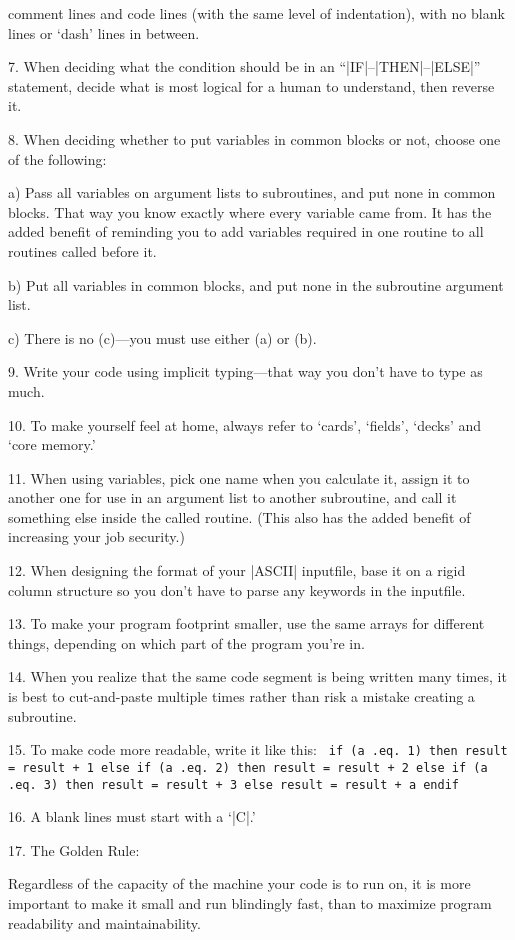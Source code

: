    comment lines and code lines (with the same level of indentation), with 
   no blank lines or `dash' lines in between.
\item{7.} When deciding what the condition should be in an
``|IF|--|THEN|--|ELSE|'' statement, decide what is most logical for a
human to understand, then reverse it.
\item{8.} When deciding whether to put variables in common blocks or not, choose
   one of the following:%
      \startlist%
      \item{a)} Pass all variables on argument lists to subroutines, and put none
         in common blocks.  That way you know exactly where every variable
         came from.  It has the added benefit of reminding you to add 
         variables required in one routine to all routines called before it.
      \item{b)} Put all variables in common blocks, and put none in the
      subroutine argument list.
      \item{c)} There is no (c)---you must use either (a) or (b).
      \endlist
\item{9.} Write your code using implicit typing---that way you don't have to type
   as much.
\item{10.} To make yourself feel at home, always refer to `cards', `fields',
`decks' and `core memory.'
\item{11.} When using variables, pick one name when you calculate it, assign
    it to another one for use in an argument list to another subroutine,
    and call it something else inside the called routine.
    (This also has the added benefit of increasing your job security.)
\item{12.} When designing the format of your |ASCII| inputfile, base it on
a rigid column structure so you don't have to parse any keywords in 
the inputfile.
\item{13.} To make your program footprint smaller, use the same arrays for
different things, depending on which part of the program you're in.
\item{14.} When you realize that the same code segment is being written many
    times, it is best to cut-and-paste multiple times rather than risk a 
    mistake creating a subroutine.
\item{15.} To make code more readable, write it like this:
{\smallskip\narrower\parskip=2pt\obeylines\tt%
    if (a .eq.\ 1) then
    \quad result = result + 1
    else if (a .eq.\ 2) then
    \quad result = result + 2
    else if (a .eq.\ 3) then
    \quad result = result + 3
    else
    \quad result = result + a
    endif\smallskip}%
\item{16.} A blank lines must start with a `|C|.'
\item{17.} The Golden Rule: 
\item{} Regardless of the capacity of the machine your code is to run on,
      it is more important to make it small and run blindingly fast,
      than to maximize program readability and maintainability.
\endlist

\bye
